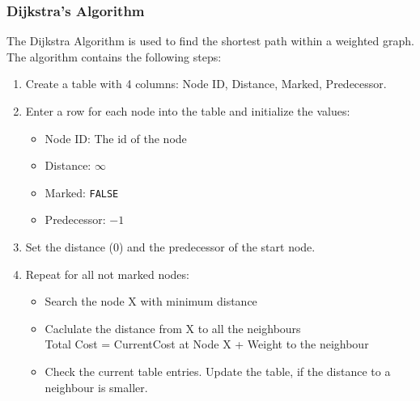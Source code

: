 \begin{frame}[fragile]
\frametitle{Dijkstra's Algorithm}
The Dijkstra Algorithm is used to find the shortest path within a weighted graph.\\
The algorithm contains the following steps:

{\tiny
\begin{enumerate}
\item Create a table with 4 columns: Node ID, Distance, Marked, Predecessor.
\item Enter a row for each node into the table and initialize the values:
\begin{itemize}
\item Node ID: The id of the node
\item Distance: $\infty$
\item Marked: \verb|FALSE|
\item Predecessor: $-1$
\end{itemize}
\item Set the distance (0) and the predecessor of the start node.
\item Repeat for all not marked nodes:
\begin{itemize}
\item Search the node X with minimum distance
\item Caclulate the distance from X to all the neighbours\\
Total Cost = CurrentCost at Node X + Weight to the neighbour
\item Check the current table entries. Update the table, if
the distance to a neighbour is smaller.
\end{itemize}
\end{enumerate}
}

\end{frame}

